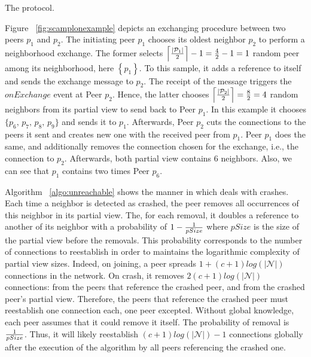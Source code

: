 \begin{algorithm}
  
  \caption{\label{algo:scamplon}The \SCAMPLON{} protocol.}
\end{algorithm}


\begin{asparadesc}
\item [Figure]~\ref{fig:scamplonexample} depicts an exchanging procedure
  between two peers $p_1$ and $p_2$. The initiating peer $p_1$ chooses its
  oldest neighbor $p_2$ to perform a neighborhood exchange. The former selects
  $\left\lceil{|\mathcal{P}_1|\over{2}}\right\rceil-1={4\over{2}}-1=1$ random
  peer among its neighborhood, here $\left\{p_1\right\}$. To this sample, it
  adds a reference to itself and sends the exchange message to $p_2$. The
  receipt of the message triggers the $onExchange$ event at Peer $p_2$. Hence,
  the latter chooses
  $\left\lceil{|\mathcal{P}_2|\over{2}}\right\rceil= {8\over{2}}=4$ random
  neighbors from its partial view to send back to Peer $p_1$. In this example
  it chooses $\{p_6,\,p_7,\,p_8,\,p_9\}$ and sends it to $p_1$. Afterwards,
  Peer $p_2$ cuts the connections to the peers it sent and creates new one with
  the received peer from $p_1$. Peer $p_1$ does the same, and additionally
  removes the connection chosen for the exchange, i.e., the connection to
  $p_2$. Afterwards, both partial view contains $6$ neighbors. Also, we can see
  that $p_1$ contains two times Peer $p_6$.
\end{asparadesc}



\begin{asparadesc}
\item [Algorithm]~\ref{algo:unreachable} shows the manner in which \SCAMPLON{}
  deals with crashes. Each time a neighbor is detected as crashed, the peer
  removes all occurrences of this neighbor in its partial view. The, for each
  removal, it doubles a reference to another of its neighbor with a probability
  of $1-{1\over{pSize}}$ where $pSize$ is the size of the partial view before
  the removals. This probability corresponds to the number of connections to
  reestablish in order to maintains the logarithmic complexity of partial view
  sizes. Indeed, on joining, a peer spreads $1+(c+1)log(|\mathcal{N}|)$
  connections in the network. On crash, it removes $2(c+1)log(|\mathcal{N}|)$
  connections: from the peers that reference the crashed peer, and from the
  crashed peer's partial view. Therefore, the peers that reference the crashed
  peer must reestablish one connection each, one peer excepted. Without global
  knowledge, each peer assumes that it could remove it itself. The probability
  of removal is ${1\over{pSize}}$. Thus, it will likely reestablish
  $(c+1)log(|\mathcal{N}|)-1$ connections globally after the execution of the
  algorithm by all peers referencing the crashed one.
\end{asparadesc}

